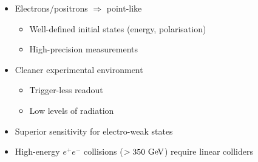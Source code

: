 \begin{frame}
\begin{columns}[t]

    \begin{itemize}
    \item Electrons/positrons $\Rightarrow$ point-like
      \begin{itemize}
      \item Well-defined initial states (energy, polarisation)
      \item High-precision measurements
      \end{itemize}
    \item Cleaner experimental environment
      \begin{itemize}
      \item Trigger-less readout
      \item Low levels of radiation
      \end{itemize}
    \item Superior sensitivity for electro-weak states
    \item High-energy $e^+e^-$ collisions ($>350\,\mathrm{\,Ge\kern -0.1em V}$) require
      linear colliders
    \end{itemize}

  \end{columns}

\end{frame}


